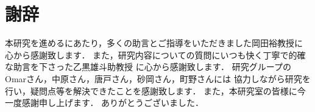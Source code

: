 \chapter{謝辞}
本研究を進めるにあたり，多くの助言とご指導をいただきました岡田裕教授に
心から感謝致します．
また，研究内容についての質問にいつも快く丁寧で的確な助言を下さった乙黒雄斗助教授
に心から感謝致します．
研究グループのOmarさん，中原さん，唐戸さん，砂岡さん，町野さんには
協力しながら研究を行い，疑問点等を解決できたことを感謝致します．
また，本研究室の皆様に今一度感謝申し上げます．
ありがとうございました．